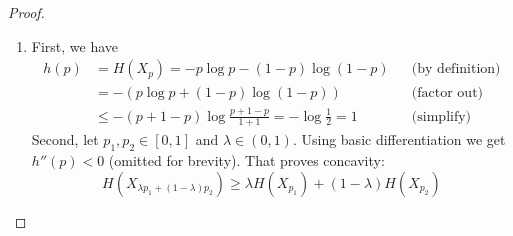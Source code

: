 \begin{proof}
\begin{enumerate}
        \item
            First, we have
            \begin{align*}
                h(p) &= H(X_p) = -p \log p - (1-p) \log (1-p)       && \text{(by definition)} \\
                &= -(p \log p + (1-p) \log (1-p))                   && \text{(factor out)} \\
                &\le -(p + 1 - p) \log \frac{p + 1 - p}{1 + 1} = -\log \frac{1}{2} = 1  && \text{(simplify)}
            \end{align*}
            Second, let $p_1, p_2 \in [0, 1]$ and $\lambda \in (0, 1)$.
	    Using basic differentiation we get $h''(p) < 0$ (omitted for brevity). That proves concavity: 
	    \[ H(X_{\lambda p_1 + (1-\lambda) p_2}) \ge \lambda H(X_{p_1}) + (1-\lambda) H(X_{p_2}) \]
    \end{enumerate}
\end{proof}
